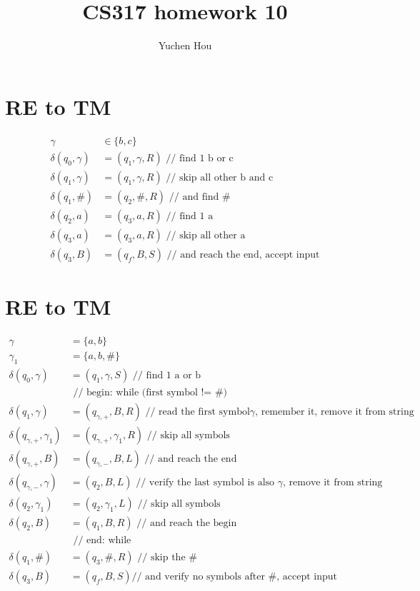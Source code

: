 \documentclass{article}
\begin{document}
\lstset{language=Java}
\title{CS317 homework 10}
\author{Yuchen Hou}
\maketitle

\section{RE to TM}
\begin{align*}
\gamma &\in \{b, c\}\\
\delta(q_0, \gamma) &= (q_1, \gamma, R) \text{ // find 1 b or c}\\
\delta(q_1, \gamma) &= (q_1, \gamma, R) \text{ // skip all other b and c}\\
\delta(q_1, \#) &= (q_2, \#, R) \text{ // and find \#}\\
\delta(q_2, a) &= (q_3, a, R) \text{ // find 1 a}\\
\delta(q_3, a) &= (q_3, a, R) \text{ // skip all other a}\\
\delta(q_3, B) &= (q_f, B, S) \text{ // and reach the end, accept input}
\end{align*}

\section{RE to TM}
\begin{align*}
\gamma &= \{a, b\}\\
\gamma_1 &= \{a, b, \#\}\\
\delta(q_0, \gamma) &= (q_1, \gamma, S) \text{ // find 1 a or b}\\
&\text{ // begin: while (first symbol != \#)}\\
\delta(q_1, \gamma) &= (q_{\gamma,+}, B, R) \text{ // read the first symbol
$\gamma$, remember it, remove it from string}\\
\delta(q_{\gamma,+}, \gamma_1) &= (q_{\gamma,+}, \gamma_1, R) \text{ // skip all
symbols}\\
\delta(q_{\gamma,+}, B) &= (q_{\gamma,-}, B, L) \text{ // and reach the end}\\
\delta(q_{\gamma,-}, \gamma) &= (q_2, B, L) \text{ // verify the last symbol is
also $\gamma$, remove it from string}\\
\delta(q_2, \gamma_1) &= (q_2, \gamma_1, L) \text{ // skip all symbols}\\
\delta(q_2, B) &= (q_1, B, R) \text{ // and reach the begin}\\
&\text{ // end: while}\\
\delta(q_1, \#) &= (q_3, \#, R) \text{ // skip the \#}\\
\delta(q_3, B) &= (q_f, B, S) \text{// and verify no symbols after \#, accept
input}
\end{align*}
\end{document}

